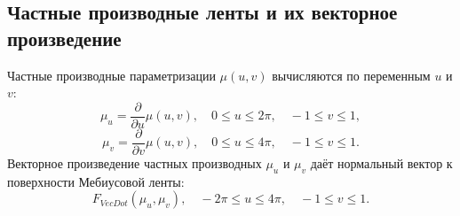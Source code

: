 \documentclass{article}
\begin{document}
        \subsection*{Частные производные ленты и их векторное произведение}
        Частные производные параметризации $\mu(u, v)$ вычисляются по переменным $u$ и $v$:
        \[
        \mu_u = \frac{\partial}{\partial u} \mu(u, v), \quad
        0 \leq u \leq 2\pi, \quad -1 \leq v \leq 1,
        \]
        \[
        \mu_v = \frac{\partial}{\partial v} \mu(u, v), \quad
        0 \leq u \leq 4\pi, \quad -1 \leq v \leq 1.
        \]
        Векторное произведение частных производных $\mu_u$ и $\mu_v$ даёт нормальный вектор к поверхности Мебиусовой ленты:
        \[
        F_{VecDot}(\mu_u, \mu_v), \quad -2\pi \leq u \leq 4\pi, \quad -1 \leq v \leq 1.
        \]
        
\end{document}
